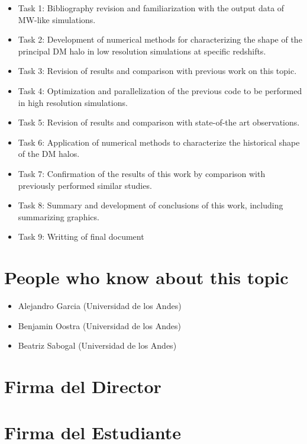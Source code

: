 \documentclass[12pt]{article}
\begin{document}
\begin{itemize}
	\item Task 1: Bibliography revision and familiarization with the output data of MW-like simulations.
	\item Task 2: Development of numerical methods for characterizing the shape of the principal DM halo in low resolution simulations at specific redshifts.
	\item Task 3: Revision of results and comparison with  previous work on this topic.
	\item Task 4: Optimization and parallelization of the previous code to be performed in high resolution simulations.
	\item Task 5: Revision of results and comparison with state-of-the art observations.
	\item Task 6: Application of numerical methods to characterize the historical shape of the DM halos.
	\item Task 7: Confirmation of the results of this work by comparison with previously performed similar studies.
	\item Task 8: Summary and development of conclusions of this work, including summarizing graphics.
	\item Task 9: Writting of final document
\end{itemize}

\section{People who know about this topic}


\begin{itemize}
	\item Alejandro Garcia (Universidad de los Andes)
	\item Benjamin Oostra (Universidad de los Andes)
	\item Beatriz Sabogal (Universidad de los Andes)
\end{itemize}







\section*{Firma del Director}
\vspace{1.5cm}

\section*{Firma del Estudiante}
\end{document}

